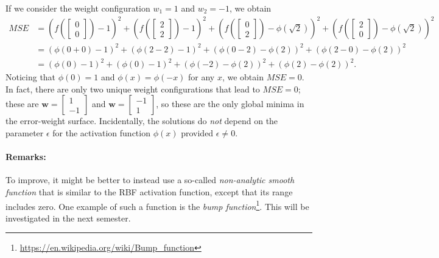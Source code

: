 \documentclass{article}
\renewcommand\vec{\mathbf}
\begin{document}
If we consider the weight configuration $w_1=1$ and $w_2=-1$, we obtain
\begin{align*}
    MSE &= \left(f\left( \begin{bmatrix} 0 \\ 0 \end{bmatrix} \right) - 1 \right)^2 + \left(f\left( \begin{bmatrix} 2 \\ 2 \end{bmatrix} \right) - 1 \right)^2 + \left(f\left( \begin{bmatrix} 0 \\ 2 \end{bmatrix} \right) - \phi\left( \sqrt{2} \right) \right)^2 + \left(f\left( \begin{bmatrix} 2 \\ 0 \end{bmatrix} \right) - \phi\left( \sqrt{2} \right) \right)^2
    \\ &= \left(\phi \left( 0 + 0 \right) - 1 \right)^2 + \left(\phi \left( 2 - 2 \right) - 1 \right)^2 + \left(\phi \left( 0 - 2 \right) - \phi\left( 2 \right) \right)^2 + \left(\phi \left( 2 - 0 \right) - \phi\left( 2 \right) \right)^2
    \\ &= \left(\phi \left( 0 \right) - 1 \right)^2 + \left(\phi \left( 0 \right) - 1 \right)^2 + \left(\phi \left( - 2 \right) - \phi\left( 2 \right) \right)^2 + \left(\phi \left( 2 \right) - \phi\left( 2 \right) \right)^2.
\end{align*}
Noticing that $\phi(0)=1$ and $\phi(x)=\phi(-x)$ for any $x$, we obtain $MSE=0$. 
In fact, there are only two unique weight configurations that lead to $MSE=0$; these are $\vec{w}=\begin{bmatrix}1\\-1 \end{bmatrix}$ and $\vec{w}=\begin{bmatrix}-1\\ 1 \end{bmatrix}$, so these are the only global minima in the error-weight surface. 
Incidentally, the solutions do \textit{not} depend on the parameter $\epsilon$ for the activation function $\phi(x)$ provided $\epsilon \neq 0$. 

\paragraph{Remarks:}
To improve, it might be better to instead use a so-called \textit{non-analytic smooth function} that is similar to the RBF activation function, except that its range includes zero. 
One example of such a function is the \textit{bump function}\footnote{\url{https://en.wikipedia.org/wiki/Bump_function}}. 
This will be investigated in the next semester.
\end{document}
